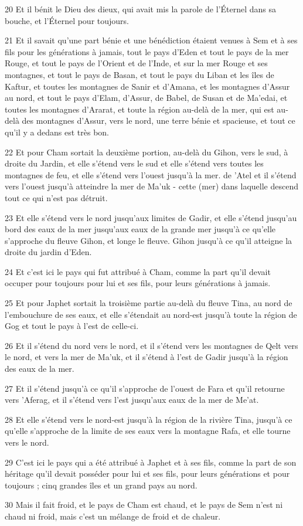 \par 20 Et il bénit le Dieu des dieux, qui avait mis la parole de l'Éternel dans sa bouche, et l'Éternel pour toujours.
\par 21 Et il savait qu'une part bénie et une bénédiction étaient venues à Sem et à ses fils pour les générations à jamais, tout le pays d'Eden et tout le pays de la mer Rouge, et tout le pays de l'Orient et de l'Inde, et sur la mer Rouge et ses montagnes, et tout le pays de Basan, et tout le pays du Liban et les îles de Kaftur, et toutes les montagnes de Sanir et d'Amana, et les montagnes d'Assur au nord, et tout le pays d'Elam, d'Assur, de Babel, de Susan et de Ma'edai, et toutes les montagnes d'Ararat, et toute la région au-delà de la mer, qui est au-delà des montagnes d'Assur, vers le nord, une terre bénie et spacieuse, et tout ce qu'il y a dedans est très bon.
\par 22 Et pour Cham sortait la deuxième portion, au-delà du Gihon, vers le sud, à droite du Jardin, et elle s'étend vers le sud et elle s'étend vers toutes les montagnes de feu, et elle s'étend vers l'ouest jusqu'à la mer. de 'Atel et il s'étend vers l'ouest jusqu'à atteindre la mer de Ma'uk - cette (mer) dans laquelle descend tout ce qui n'est pas détruit.
\par 23 Et elle s'étend vers le nord jusqu'aux limites de Gadir, et elle s'étend jusqu'au bord des eaux de la mer jusqu'aux eaux de la grande mer jusqu'à ce qu'elle s'approche du fleuve Gihon, et longe le fleuve. Gihon jusqu'à ce qu'il atteigne la droite du jardin d'Eden.
\par 24 Et c'est ici le pays qui fut attribué à Cham, comme la part qu'il devait occuper pour toujours pour lui et ses fils, pour leurs générations à jamais.
\par 25 Et pour Japhet sortait la troisième partie au-delà du fleuve Tina, au nord de l'embouchure de ses eaux, et elle s'étendait au nord-est jusqu'à toute la région de Gog et tout le pays à l'est de celle-ci.
\par 26 Et il s'étend du nord vers le nord, et il s'étend vers les montagnes de Qelt vers le nord, et vers la mer de Ma'uk, et il s'étend à l'est de Gadir jusqu'à la région des eaux de la mer.
\par 27 Et il s'étend jusqu'à ce qu'il s'approche de l'ouest de Fara et qu'il retourne vers 'Aferag, et il s'étend vers l'est jusqu'aux eaux de la mer de Me'at.
\par 28 Et elle s'étend vers le nord-est jusqu'à la région de la rivière Tina, jusqu'à ce qu'elle s'approche de la limite de ses eaux vers la montagne Rafa, et elle tourne vers le nord.
\par 29 C'est ici le pays qui a été attribué à Japhet et à ses fils, comme la part de son héritage qu'il devait posséder pour lui et ses fils, pour leurs générations et pour toujours ; cinq grandes îles et un grand pays au nord.
\par 30 Mais il fait froid, et le pays de Cham est chaud, et le pays de Sem n'est ni chaud ni froid, mais c'est un mélange de froid et de chaleur.

